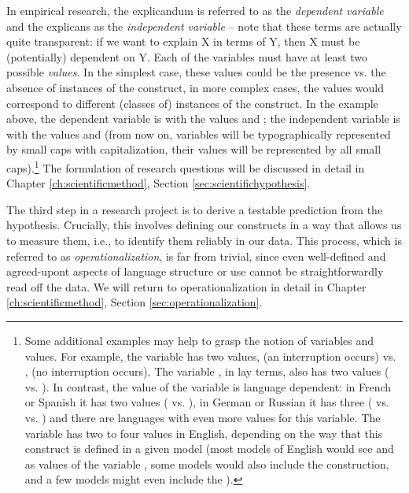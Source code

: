 In empirical research, the explicandum is referred to as the \emph{dependent variable} and the explicans as the \emph{independent variable} -- note that these terms are actually quite transparent: if we want to explain X in terms of Y, then X must be (potentially) dependent on Y. Each of the variables must have at least two possible \emph{values}. In the simplest case, these values could be the presence vs. the absence of instances of the construct, in more complex cases, the values would correspond to different (classes of) instances of the construct. In the example above, the dependent variable is  with the values  and ; the independent variable is  with the values  and  (from now on, variables will be typographically represented by small caps with capitalization, their values will be represented by all small caps).\footnote{Some additional examples may help to grasp the notion of variables and values. For example, the variable  has two values,  (an interruption occurs) vs. , (no interruption occurs). The variable , in lay terms, also has two values ( vs. ). In contrast, the value of the variable  is language dependent: in French or Spanish it has two values ( vs. ), in German or Russian it has three ( vs.  vs. ) and there are languages with even more values for this variable. The variable  has two to four values in English, depending on the way that this construct is defined in a given model (most models of English would see  and  as values of the variable , some models would also include the  construction, and a few models might even include the ).} The formulation of research questions will be discussed in detail in Chapter \ref{ch:scientificmethod}, Section \ref{sec:scientifichypothesis}.

The third step in a research project is to derive a testable prediction from the hypothesis. Crucially, this involves defining our constructs in a way that allows us to measure them, i.e., to identify them reliably in our data. This process, which is referred to as \emph{operationalization}, is far from trivial, since even well-defined and agreed-upont aspects of language structure or use cannot be straightforwardly read off the data. We will return to operationalization in detail in Chapter \ref{ch:scientificmethod}, Section \ref{sec:operationalization}.

